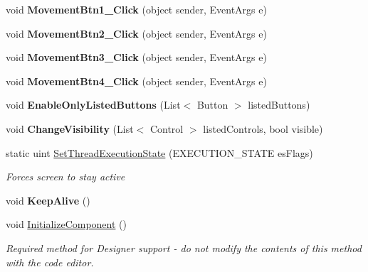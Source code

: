 \begin{DoxyCompactItemize}
void {\bfseries Movement\+Btn1\+\_\+\+Click} (object sender, Event\+Args e)
\item 
\mbox{\label{class_chess_tracking_1_1_user_interface_1_1_main_game_form_a2242f5db27aed365033db4889b7eca86}} 
void {\bfseries Movement\+Btn2\+\_\+\+Click} (object sender, Event\+Args e)
\item 
\mbox{\label{class_chess_tracking_1_1_user_interface_1_1_main_game_form_a3ba981dae8bc044e3581e31def892ba8}} 
void {\bfseries Movement\+Btn3\+\_\+\+Click} (object sender, Event\+Args e)
\item 
\mbox{\label{class_chess_tracking_1_1_user_interface_1_1_main_game_form_ab4929260144f0c8a15cb540f60246890}} 
void {\bfseries Movement\+Btn4\+\_\+\+Click} (object sender, Event\+Args e)
\item 
\mbox{\label{class_chess_tracking_1_1_user_interface_1_1_main_game_form_a8de8a4ae9c118d617b70bf2326fd11cc}} 
void {\bfseries Enable\+Only\+Listed\+Buttons} (List$<$ Button $>$ listed\+Buttons)
\item 
\mbox{\label{class_chess_tracking_1_1_user_interface_1_1_main_game_form_a3548c23551192c4e76d5f23be9df5baf}} 
void {\bfseries Change\+Visibility} (List$<$ Control $>$ listed\+Controls, bool visible)
\item 
static uint \mbox{\hyperlink{class_chess_tracking_1_1_user_interface_1_1_main_game_form_a2cce03d9e87b9a4afb0d1f9e631bafc2}{Set\+Thread\+Execution\+State}} (E\+X\+E\+C\+U\+T\+I\+O\+N\+\_\+\+S\+T\+A\+TE es\+Flags)
\begin{DoxyCompactList}\small\item\em Forces screen to stay active \end{DoxyCompactList}\item 
\mbox{\label{class_chess_tracking_1_1_user_interface_1_1_main_game_form_abeccdec99f0eed38c17bb30885b18746}} 
void {\bfseries Keep\+Alive} ()
\item 
void \mbox{\hyperlink{class_chess_tracking_1_1_user_interface_1_1_main_game_form_a27ab4f2f64bddebc0ce3e9c566efccb0}{Initialize\+Component}} ()
\begin{DoxyCompactList}\small\item\em Required method for Designer support -\/ do not modify the contents of this method with the code editor. \end{DoxyCompactList}\end{DoxyCompactItemize}
